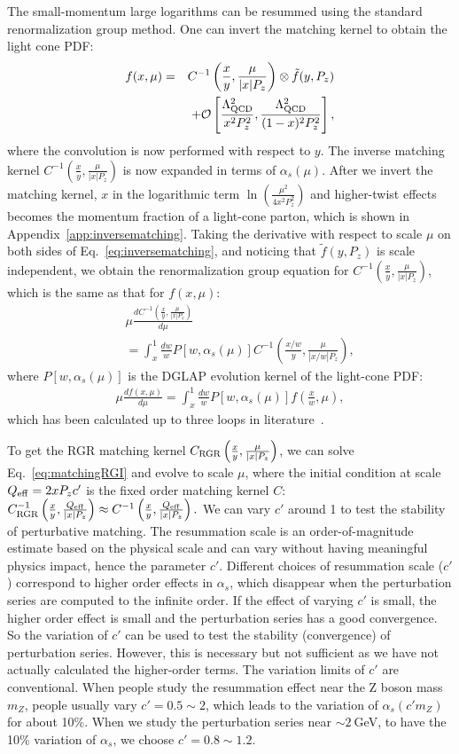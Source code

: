 \documentclass[prd,aps,twocolumn,preprintnumbers, showpacs, nofootinbib,superscriptaddress,notitlepage]{revtex4-2}
\def\bea{\begin{eqnarray}}
\def\eea{\end{eqnarray}}
\begin{document}
The small-momentum large logarithms can be resummed using
the standard renormalization group method. 
One can invert the matching kernel to obtain the light cone PDF:
\bea\label{eq:inversematching}
f(x,\mu) =&& C^{-1}\left(\frac{x}{y}, \frac{\mu}{|x| P_{z}}\right) \otimes \tilde{f}(y,P_z) \nonumber\\
&&+ {\cal O}\left[\frac{\Lambda_{\rm QCD}^2}{x^2 P_{z}^2}, \frac{\Lambda_{\rm QCD}^2}{(1-x)^2 P_{z}^2}\right],
\eea
where the convolution is now performed with respect to $y$. The inverse matching kernel $C^{-1}\left(\frac{x}{y}, \frac{\mu}{|x| P_{z}}\right)$ is now expanded in terms of $\alpha_s(\mu)$. After we invert the matching kernel, $x$ in the logarithmic term $\ln \left(\frac{\mu^2}{4 x^2 P_z^2} \right)$ and higher-twist effects becomes the momentum fraction of a light-cone parton, which is shown in Appendix~\ref{app:inversematching}. Taking the derivative with respect to scale $\mu$ on both sides of Eq.~\eqref{eq:inversematching}, and noticing that $\tilde{f}(y,P_z)$ is scale independent,
we obtain the renormalization group equation for $C^{-1}\left(\frac{x}{y}, \frac{\mu}{|x| P_{z}}\right)$, which is the same as that for $f(x,\mu)$:
\bea\label{eq:matchingRGI}
&&\mu \frac{d C^{-1}\left(\frac{x}{y},\frac{\mu}{|x| P_z}\right)}{d\mu} \nonumber\\ 
&&= \int_{x}^{1} \frac{dw}{w} P[w,\alpha_{s}(\mu)] C^{-1}\left(\frac{x/w}{y},\frac{\mu}{|x/w| P_z}\right), 
\eea
where $P[w,\alpha_{s}(\mu)]$ is the DGLAP evolution kernel of the light-cone PDF:
\bea\label{eq:DGLAP}
\mu \frac{d f(x,\mu)}{d \mu} = \int_{x}^{1} \frac{d w}{w} P[w,\alpha_{s}(\mu)]f\left(\frac{x}{w},\mu\right),
\eea
which has been calculated up to three loops in literature~\cite{Moch:2004pa}. 

To get the RGR matching kernel $C_{\rm RGR}\left(\frac{x}{y},\frac{\mu}{|x|P_{z}}\right)$, we can solve Eq.~\eqref{eq:matchingRGI} and evolve to scale $\mu$, where the initial condition at scale $Q_{\rm eff}=2 x P_{z} c'$ is the fixed order matching kernel $C$: 
$C^{-1}_{\rm RGR}\left(\frac{x}{y},\frac{Q_{\rm eff}}{|x|P_{z}}\right)\approx C^{-1}\left(\frac{x}{y},\frac{Q_{\rm eff}}{|x|P_{z}}\right).$
We can vary $c'$ around 1 to test the stability of perturbative matching. The resummation scale is an order-of-magnitude estimate based on the physical scale and can vary without having meaningful physics impact, hence the parameter $c'$. Different choices of
resummation scale ($c'$) correspond to higher order effects in $\alpha_s$, which disappear when the perturbation series are computed to the infinite order.
If the effect of varying $c'$ is small, the higher order effect is small and the perturbation series has a good convergence. 
So the variation of $c'$ can be used to test the stability (convergence) of perturbation series. However, this is necessary but not sufficient as we have not actually calculated the higher-order terms. 
The variation limits of $c'$ are conventional. When people study the resummation effect near the Z boson mass $m_Z$, people usually vary $c'=0.5\sim2$, which leads to the variation of $\alpha_s(c'm_Z)$ for about 10\%. When we study the perturbation series near $\sim 2~$GeV, to have the 10\% variation of $\alpha_s$, we choose $c'=0.8\sim1.2$.
\end{document}
